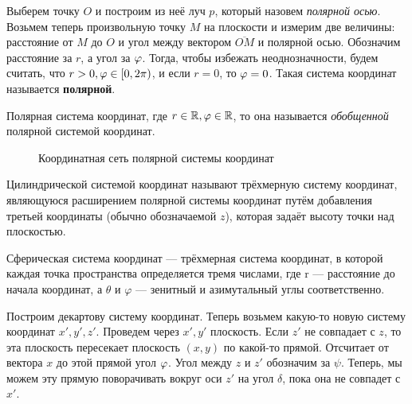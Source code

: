 	\Pagebreak

	\begin{Def}
		Выберем точку $O$ и построим из неё луч $p$, который назовем \textit{полярной осью}. Возьмем теперь произвольную точку $M$ на плоскости и измерим две величины:
		расстояние от $M$ до $O$ и угол между вектором $\overline{OM}$ и полярной осью. Обозначим расстояние за $r$, а угол за $\varphi$.
		Тогда, чтобы избежать неоднозначности, будем считать, что $r > 0, \varphi \in [0, 2\pi)$, и если $r = 0$, то $\varphi = 0$.    
		Такая система координат называется \textbf{полярной}.		

	\end{Def}

	\begin{figure*}[h]
		\centering
		\def\svgwidth{0.3\columnwidth}
		
	\end{figure*}

	\begin{Def}
		Полярная система координат, где $r \in \mathbb{R}, \varphi \in \mathbb{R}$, то она называется \textit{обобщенной} полярной системой координат.
	\end{Def}

	\begin{figure*}[h!]
		\centering
		\def\svgwidth{0.3\columnwidth}
		
		\caption{Координатная сеть полярной системы координат}
	\end{figure*}

	\begin{Def}
		Цилиндрической системой координат называют трёхмерную систему координат, являющуюся расширением полярной системы координат путём добавления третьей координаты (обычно обозначаемой ${\displaystyle z}$), которая задаёт высоту точки над плоскостью.
	\end{Def}

	\begin{Def}
		Сферическая система координат — трёхмерная система координат, в которой каждая точка пространства определяется тремя числами, где r — расстояние до начала координат, а $\theta$ и $\varphi$ — зенитный и азимутальный углы соответственно.
	\end{Def}


	Построим декартову систему координат. Теперь возьмем какую-то новую систему координат $x', y', z'$.
	Проведем через $x', y'$ плоскость. Если $z'$ не совпадает с $z$, то эта плоскость пересекает плоскость $(x, y)$ по какой-то прямой.
	Отсчитает от вектора $x$ до этой прямой угол $\varphi$. Угол между $z$ и $z'$ обозначим за $\psi$.
	Теперь, мы можем эту прямую поворачивать вокруг оси $z'$ на угол $\delta$, пока она не совпадет с $x'$.
	
